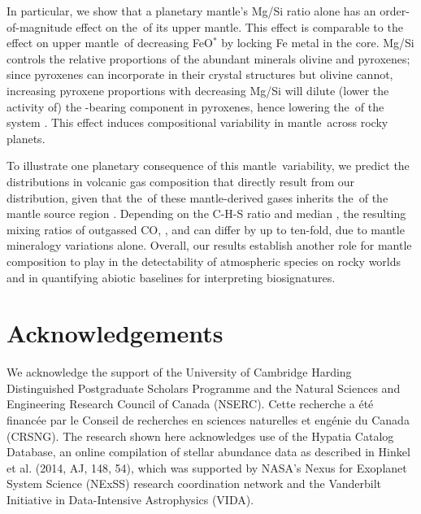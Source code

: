 In particular, we show that a planetary mantle’s Mg/Si ratio alone has an order-of-magnitude effect on the \fo\,of its upper mantle. This effect is comparable to the effect on upper mantle \fo\,of decreasing FeO$^*$ by locking Fe metal in the core. Mg/Si controls the relative proportions of the abundant minerals olivine and pyroxenes; since pyroxenes can incorporate \ferric\;in their crystal structures but olivine cannot, increasing pyroxene proportions with decreasing Mg/Si will dilute (lower the activity of) the \ferric-bearing component in pyroxenes, hence lowering the \fo\,of the system \citep{stolper_effects_2020}. This effect induces compositional variability in mantle \fo\,across rocky planets.

To illustrate one planetary consequence of this mantle \fo\,variability, we predict the distributions in volcanic gas composition that directly result from our \fo\,distribution, given that the \fo\,of these mantle-derived gases inherits the \fo\,of the mantle source region \citep[e.g.,][]{gaillard_redox_2015}. Depending on the C-H-S ratio and median \fo, the resulting mixing ratios of outgassed CO, , and  can differ by up to ten-fold, due to mantle mineralogy variations alone. Overall, our results establish another role for mantle composition to play in the detectability of atmospheric species on rocky worlds and in quantifying abiotic baselines for interpreting biosignatures.



\section*{Acknowledgements}

We acknowledge the support of the University of Cambridge Harding Distinguished Postgraduate Scholars Programme and the Natural Sciences and Engineering Research Council of Canada (NSERC). Cette recherche a \'et\'e financ\'ee par le Conseil de recherches en sciences naturelles et eng\'enie du Canada (CRSNG). The research shown here acknowledges use of the Hypatia Catalog Database, an online compilation of stellar abundance data as described in Hinkel et al. (2014, AJ, 148, 54), which was supported by NASA's Nexus for Exoplanet System Science (NExSS) research coordination network and the Vanderbilt Initiative in Data-Intensive Astrophysics (VIDA).



